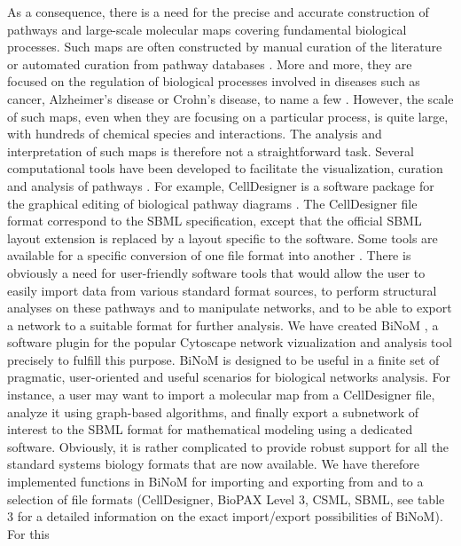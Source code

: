 \documentclass[10pt]{bmc_article}
\newenvironment{bmcformat}{\baselineskip20pt\sloppy\setboolean{publ}{false}}{\baselineskip20pt\sloppy}
\begin{document}
\begin{bmcformat}
As a consequence, there is a need for the precise and accurate construction of
pathways and large-scale molecular maps covering fundamental biological
processes. Such maps are often constructed by manual curation of the literature or
automated curation from pathway databases \cite{bauer2009pathway}. More and more, they
are focused on the regulation of biological processes involved in diseases such
as cancer, Alzheimer's disease or Crohn's disease, to name a few \cite{oda2005comprehensive, oda2006comprehensive,
calzone2008comprehensive, caron2010comprehensive}. However, the scale of such
maps, even when they are focusing on a particular process, is quite large, with
hundreds of chemical species and interactions. The analysis and interpretation of such
 maps is therefore not a straightforward task. Several computational
tools have been developed to facilitate the visualization, curation and analysis
of pathways \cite{adriaens2008public}. For example, CellDesigner is a software package
for the graphical editing of biological pathway diagrams
\cite{funahashi2003celldesigner}. The CellDesigner file format correspond to the
SBML specification, except that the official SBML layout extension is replaced
by a layout specific to the software. Some tools are
available for a specific conversion of one file format into another
\cite{mi2011biopax, buchel2012qualitative}. There is obviously
a need for user-friendly software tools that would allow the user to easily
import data from various standard format sources, to perform structural analyses on these pathways
and to manipulate networks, and to be able to export a network to a suitable
format for further analysis. We have created
BiNoM \cite{zinovyev2008binom}, a software plugin for the popular Cytoscape
network vizualization and analysis tool \cite{cline2007integration} precisely to fulfill this purpose.
BiNoM is designed to be useful in a finite set of pragmatic, user-oriented and
useful scenarios for biological networks analysis. For instance, a user may want
to import a molecular map from a CellDesigner file, analyze it using graph-based
algorithms, and finally export a subnetwork of interest to the SBML format for
mathematical modeling using a dedicated software. Obviously, it is rather
complicated to provide robust support for all the standard systems biology
formats that are now available. We have therefore implemented functions in BiNoM
for importing and exporting from and to a selection of file formats
(CellDesigner, BioPAX Level 3, CSML, SBML, see table 3 for a detailed
information on the exact import/export possibilities of BiNoM). For this

\end{bmcformat}
\end{document}
